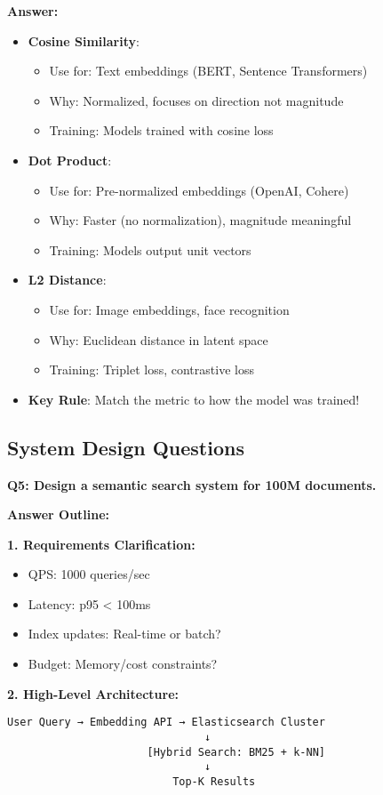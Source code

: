\documentclass[10pt]{article}
\begin{document}
\textbf{Answer:}
\begin{itemize}
\item \textbf{Cosine Similarity}:
  \begin{itemize}
  \item Use for: Text embeddings (BERT, Sentence Transformers)
  \item Why: Normalized, focuses on direction not magnitude
  \item Training: Models trained with cosine loss
  \end{itemize}
\item \textbf{Dot Product}:
  \begin{itemize}
  \item Use for: Pre-normalized embeddings (OpenAI, Cohere)
  \item Why: Faster (no normalization), magnitude meaningful
  \item Training: Models output unit vectors
  \end{itemize}
\item \textbf{L2 Distance}:
  \begin{itemize}
  \item Use for: Image embeddings, face recognition
  \item Why: Euclidean distance in latent space
  \item Training: Triplet loss, contrastive loss
  \end{itemize}
\item \textbf{Key Rule}: Match the metric to how the model was trained!
\end{itemize}

\subsection{System Design Questions}

\textbf{Q5: Design a semantic search system for 100M documents.}

\textbf{Answer Outline:}

\textbf{1. Requirements Clarification:}
\begin{itemize}
\item QPS: 1000 queries/sec
\item Latency: p95 < 100ms
\item Index updates: Real-time or batch?
\item Budget: Memory/cost constraints?
\end{itemize}

\textbf{2. High-Level Architecture:}
\begin{verbatim}
User Query → Embedding API → Elasticsearch Cluster
                               ↓
                      [Hybrid Search: BM25 + k-NN]
                               ↓
                          Top-K Results
\end{verbatim}
\end{document}
